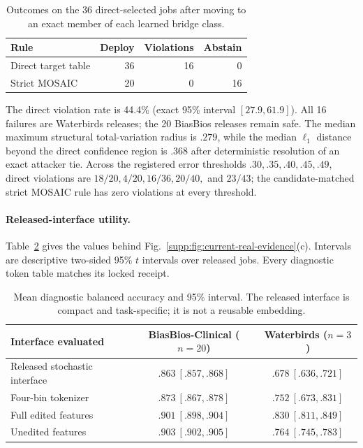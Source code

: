 \begin{table}[t]
\centering
\small
\setlength{\tabcolsep}{3.4pt}
\begin{tabular}{lrrr}
\hline
Rule & Deploy & Violations & Abstain \\
\hline
Direct target table & 36 & 16 & 0 \\
Strict MOSAIC & 20 & 0 & 16 \\
\hline
\end{tabular}
\caption{Outcomes on the 36 direct-selected jobs after moving to an exact
member of each learned bridge class.}
\label{supp:tab:admitted-shift}
\end{table}

The direct violation rate is 44.4\% (exact 95\% interval $[27.9,61.9]$).
All 16 failures are Waterbirds releases; the 20 BiasBios releases remain safe.
The median maximum structural total-variation radius is $.279$, while the
median $\ell_1$ distance beyond the direct confidence region is $.368$ after
deterministic resolution of an exact attacker tie. Across
the registered error thresholds $.30,.35,.40,.45,.49$, direct violations are
$18/20,4/20,16/36,20/40,$ and $23/43$; the candidate-matched strict MOSAIC rule
has zero violations at every threshold.

\paragraph{Released-interface utility.}
Table~\ref{supp:tab:released-utility} gives the values behind
Fig.~\ref{supp:fig:current-real-evidence}(c). Intervals are descriptive
two-sided 95\% $t$ intervals over released jobs. Every diagnostic token table
matches its locked receipt.

\begin{table}[t]
\centering
\small
\setlength{\tabcolsep}{3.8pt}
\begin{tabular}{lcc}
\hline
Interface evaluated & BiasBios-Clinical ($n=20$) & Waterbirds ($n=3$) \\
\hline
Released stochastic interface & $.863\ [.857,.868]$ & $.678\ [.636,.721]$ \\
Four-bin tokenizer & $.873\ [.867,.878]$ & $.752\ [.673,.831]$ \\
Full edited features & $.901\ [.898,.904]$ & $.830\ [.811,.849]$ \\
Unedited features & $.903\ [.902,.905]$ & $.764\ [.745,.783]$ \\
\hline
\end{tabular}
\caption{Mean diagnostic balanced accuracy and 95\% interval. The released
interface is compact and task-specific; it is not a reusable embedding.}
\label{supp:tab:released-utility}
\end{table}

